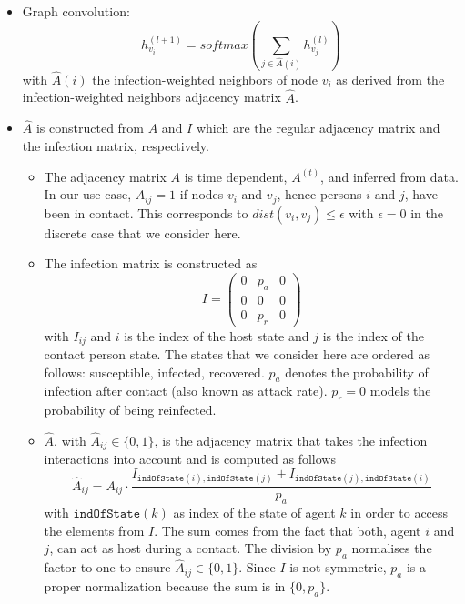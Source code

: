 \documentclass[]{article}
\newcommand{\indexOfState}[1]{\texttt{indOfState}(#1)}
\begin{document}
\begin{itemize}
	\item Graph convolution:
	\begin{equation}
		h_{v_i}^{(l+1)} = softmax(\sum_{j\in \hat{A}(i)} h_{v_j}^{(l)})
	\end{equation}
	with $\hat{A}(i)$ the infection-weighted neighbors of node $v_i$ as derived from the infection-weighted neighbors adjacency matrix $\hat{A}$.
	\item $\hat{A}$ is constructed from $A$ and $I$ which are the regular adjacency matrix and the infection matrix, respectively.
	\begin{itemize}
		\item The adjacency matrix $A$ is time dependent, $A^{(t)}$, and inferred from data. In our use case, $A_{ij}=1$ if nodes $v_i$ and $v_j$, hence persons $i$ and $j$, have been in contact. This corresponds to $dist(v_i, v_j) \le \epsilon$ with $\epsilon=0$ in the discrete case that we consider here.
		\item The infection matrix is constructed as
		\begin{equation}
			I =
			\begin{pmatrix}
				0 & p_a & 0 \\
				0 &  0  & 0 \\
				0 & p_r & 0
			\end{pmatrix}
		\end{equation}
		with $I_{ij}$ and $i$ is the index of the host state and $j$ is the index of the contact person state. The states that we consider here are ordered as follows: susceptible, infected, recovered. $p_a$ denotes the probability of infection  after contact (also known as attack rate). $p_r = 0$ models the probability of being reinfected.
		\item $\hat{A}$, with $\hat{A}_{ij}\in \{0, 1\}$, is the adjacency matrix that takes the infection interactions into account and is computed as follows
		\begin{equation}
			\hat{A}_{ij} = A_{ij}\cdot \frac{I_{\indexOfState{i}, \indexOfState{j}} + I_{\indexOfState{j}, \indexOfState{i}}}{p_a}
		\end{equation}
		with $\indexOfState{k}$ as index of the state of agent $k$ in order to access the elements from $I$. The sum comes from the fact that both, agent $i$ and $j$, can act as host during a contact. The division by $p_a$ normalises the factor to one to ensure $\hat{A}_{ij} \in \{0, 1\}$. Since $I$ is not symmetric, $p_a$ is a proper normalization because the sum is in $\{0, p_a\}$.

\end{itemize}
\end{itemize}
\end{document}

